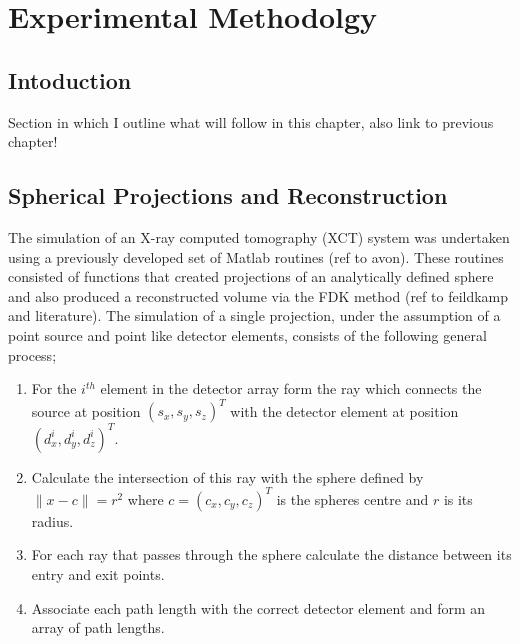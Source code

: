 \documentclass[
  twoside,
  11pt, a4paper,
  footinclude=true,
  headinclude=true,
  cleardoublepage=empty
]{scrbook}
\begin{document}
\chapter{Experimental Methodolgy}
\section{Intoduction}

Section in which I outline what will follow in this chapter, also link to previous chapter!

\section{Spherical Projections and Reconstruction}

The simulation of an X-ray computed tomography (XCT) system was undertaken using a previously developed set of Matlab routines (ref to avon). These routines consisted of functions that created projections of an analytically defined sphere and also produced a reconstructed volume via the FDK method (ref to feildkamp and literature). The simulation of a single projection, under the assumption of a point source and point like detector elements, consists of the following general process;

\begin{enumerate}
\item For the $i^{th}$ element in the detector array form the ray which connects the source at position $(s_x,s_y,s_z)^T$ with the detector element at position $(d_x^i,d_y^i,d_z^i)^T$.
\item Calculate the intersection of this ray with the sphere defined by $\|x - c\| = r^2$ where $c = (c_x,c_y,c_z)^T$ is the spheres centre and $r$ is its radius.
\item For each ray that passes through the sphere calculate the distance between its entry and exit points.
\item Associate each path length with the correct detector element and form an array of path lengths.
\end{enumerate}
\end{document}
